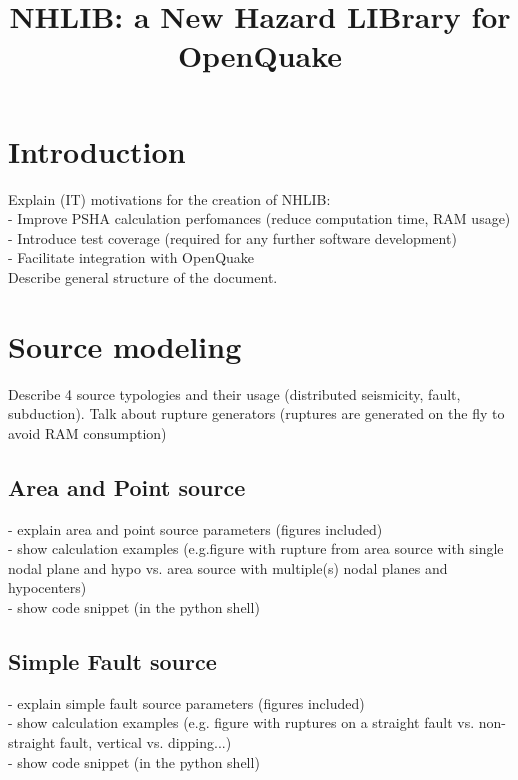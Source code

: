 \documentclass[12pt,a4paper,headings=small,version=first,dvips]{report}
\begin{document}
\title{NHLIB: a New Hazard LIBrary for OpenQuake}
\maketitle

\section*{Introduction}
Explain (IT) motivations for the creation of NHLIB:\\
- Improve PSHA calculation perfomances (reduce computation time, RAM usage)\\
- Introduce test coverage (required for any further software development)\\
- Facilitate integration with OpenQuake\\
Describe general structure of the document.\\

\section*{Source modeling}

Describe 4 source typologies and their usage (distributed seismicity, fault, subduction). Talk about rupture generators (ruptures are generated on the fly to avoid RAM consumption)

\subsection*{Area and Point source}
- explain area and point source parameters (figures included)\\
- show calculation examples (e.g.figure with rupture from area source with single nodal plane and hypo vs. area source with multiple(s) nodal planes and hypocenters)\\
- show code snippet (in the python shell)\\

\subsection*{Simple Fault source}
- explain simple fault source parameters (figures included)\\
- show calculation examples (e.g. figure with ruptures on a straight fault vs. non-straight fault, vertical vs. dipping...)\\
- show code snippet (in the python shell)\\
\end{document}
